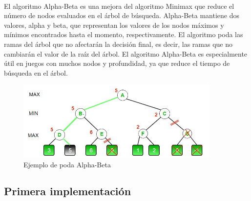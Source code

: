 \documentclass{report}
\begin{document}
          \paragraph*{}
          {
            El algoritmo Alpha-Beta es una mejora del algoritmo Minimax que reduce el número de nodos evaluados en el árbol de búsqueda. 
            Alpha-Beta mantiene dos valores, alpha y beta, que representan los valores de los nodos máximos y mínimos encontrados hasta el momento, respectivamente. 
            El algoritmo poda las ramas del árbol que no afectarán la decisión final, es decir, las ramas que no cambiarán el valor de la raíz del árbol.
            El algoritmo Alpha-Beta es especialmente útil en juegos con muchos nodos y profundidad, ya que reduce el tiempo de búsqueda en el árbol.
            
            \begin{figure}[H]
                \centering
                \includegraphics[width=0.9\textwidth]{./.img/alpha-beta.jpg}
                \caption{Ejemplo de poda Alpha-Beta}
            \end{figure}
          }
        \subsection*{Primera implementación}
          \begin{lstlisting}[language=Python, caption=Implementación inicial del agente Alpha-Beta]
          \end{lstlisting}
\end{document}
